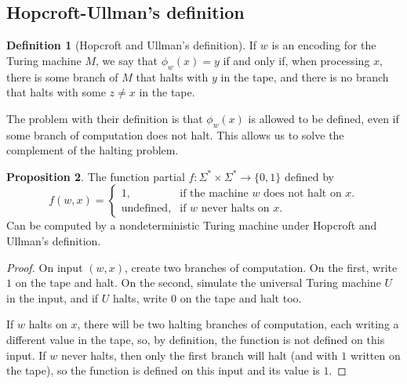 \documentclass[12pt]{article}
\theoremstyle{definition}
\newtheorem{definition}{Definition}
\newtheorem{proposition}[definition]{Proposition}
\begin{document}
\subsection{Hopcroft-Ullman's definition}
\label{sec:hopcroft-ullman}

\begin{definition}[Hopcroft and Ullman's definition\footnotemark]
    If $w$ is an encoding for the Turing machine $M$,
    we say that $\phi_w(x) = y$ if and only if,
    when processing $x$,
    there is some branch of $M$ that halts with $y$ in the tape,
    and there is no branch that halts with some $z \neq x$ in the tape.
\end{definition}

The problem with their definition is that $\phi_w(x)$ is allowed to be defined,
even if some branch of computation does not halt.
This allows us to solve the complement of the halting problem.

\begin{proposition}
    The function partial $f: \Sigma^* \times \Sigma^* \to \{0, 1\}$ defined by
    \begin{equation*}
        f(w, x) = \begin{cases}
            1, & \text{if the machine $w$ does not halt on $x$.} \\
            \text{undefined}, &\text{if $w$ never halts on $x$.}
        \end{cases}
    \end{equation*}
    Can be computed by a nondeterministic Turing machine under
    Hopcroft and Ullman's definition.
\end{proposition}

\begin{proof}
    On input $(w, x)$,
    create two branches of computation.
    On the first, write $1$ on the tape and halt.
    On the second, simulate the universal Turing machine $U$ in the input,
    and if $U$ halts, write $0$ on the tape and halt too.

    If $w$ halts on $x$,
    there will be two halting branches of computation,
    each writing a different value in the tape,
    so, by definition, the function is not defined on this input.
    If $w$ never halts,
    then only the first branch will halt
    (and with $1$ written on the tape),
    so the function is defined on this input and its value is $1$.
\end{proof}
\end{document}
